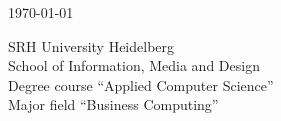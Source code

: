 \begin{titlepage}
\begin{center}
\vspace{3em}

{\normalsize {\today}}\\

\vspace{2em}

{\Large SRH University Heidelberg}\\
{\Large School of Information, Media and Design}\\
{\Large Degree course ``Applied Computer Science''}\\
{\Large Major field ``Business Computing''}\\

\vspace{3em}

\begin{normalsize}
\hspace{3cm}\\
\vspace{0.5em}
\makebox{}\hspace{3.9cm}\\
\end{normalsize}
\end{center}

\vspace*{\fill}
\end{titlepage}